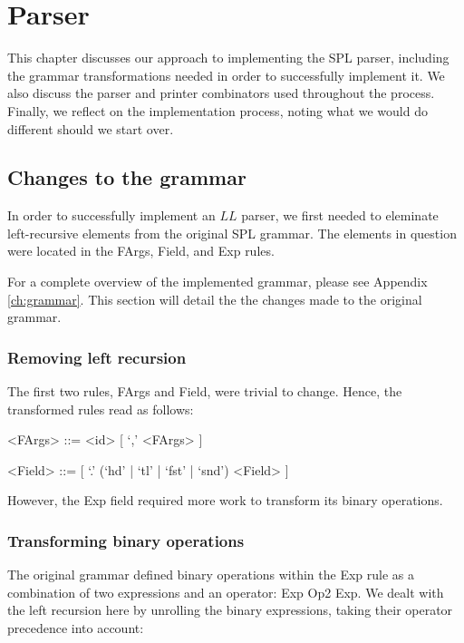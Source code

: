 \chapter{Parser}

This chapter discusses our approach to implementing the SPL parser, including the grammar transformations needed in order to successfully implement it.
We also discuss the parser and printer combinators used throughout the process.
Finally, we reflect on the implementation process, noting what we would do different should we start over.

\section{Changes to the grammar}

In order to successfully implement an $LL$ parser, we first needed to eleminate left-recursive elements from the original SPL grammar.
The elements in question were located in the \textsf{FArgs}, \textsf{Field}, and \textsf{Exp} rules.

For a complete overview of the implemented grammar, please see Appendix \ref{ch:grammar}.
This section will detail the the changes made to the original grammar.

\subsection{Removing left recursion}

The first two rules, \textsf{FArgs} and \textsf{Field}, were trivial to change.
Hence, the transformed rules read as follows:

\begin{framed}
	\begin{grammar}
	<FArgs> ::= <id> [ `,' <FArgs> ]

	<Field> ::= [ `.' (`hd' | `tl' | `fst' | `snd') <Field> ]
	\end{grammar}
\end{framed}

However, the \textsf{Exp} field required more work to transform its binary operations.

\subsection{Transforming binary operations}

The original grammar defined binary operations within the \textsf{Exp} rule as a combination of two expressions and an operator: \textsf{Exp} \textsf{Op2} \textsf{Exp}.
We dealt with the left recursion here by unrolling the binary expressions, taking their operator precedence into account:

